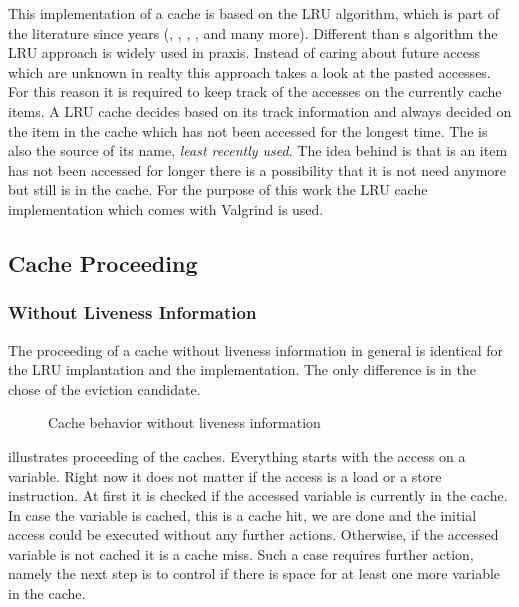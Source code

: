 \documentclass[onecolumn, openright, master, english, signatures]{dbrgrptt}
\begin{document}
This implementation of a cache is based on the \ac{LRU} algorithm, which is part of the literature since years (\cite{johnson1994x3}, \cite{drepper2007every}, \cite{patterson2011computer}, \cite{jacob2010memory}, and many more). Different than \citeauthor{belady1966study}s algorithm the \ac{LRU} approach is widely used in praxis. Instead of caring about future access which are unknown in realty this approach takes a look at the pasted accesses. For this reason it is required to keep track of the accesses on the currently cache items. A \ac{LRU} cache decides based on its track information and always decided on the item in the cache which has not been accessed for the longest time. The is also the source of its name, \emph{least recently used}. The idea behind is that is an item has not been accessed for longer there is a possibility that it is not need anymore but still is in the cache. For the purpose of this work the \ac{LRU} cache implementation which comes with Valgrind is used.

\subsection{Cache Proceeding}
\subsubsection{Without Liveness Information}\label{ssec:cache-behavior}

The proceeding of a cache without liveness information in general is identical for the \ac{LRU} implantation and the  implementation. The only difference is in the chose of the eviction candidate.

\begin{figure}[!ht]
  \centering
  
  \caption{Cache behavior without liveness information}
  \label{fig:cache-behavior}
\end{figure}

 illustrates proceeding of the caches. Everything starts with the access on a variable. Right now it does not matter if the access is a load or a store instruction. At first it is checked if the accessed variable is currently in the cache. In case the variable is cached, this is a cache hit, we are done and the initial access could be executed without any further actions.
Otherwise, if the accessed variable is not cached it is a cache miss. Such a case requires further action, namely the next step is to control if there is space for at least one more variable in the cache.
\end{document}

